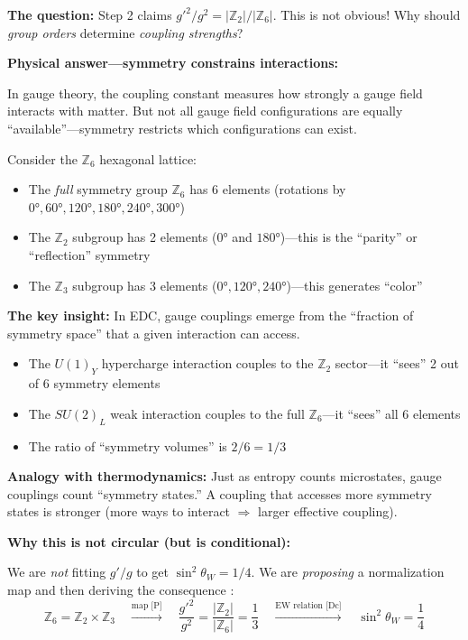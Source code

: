\begin{tcolorbox}[colback=blue!5, colframe=blue!50!black,
  title={Physical Motivation: Why Subgroup Counting $\to$ Coupling Ratios}, breakable]

\textbf{The question:} Step 2 claims $g'^2/g^2 = |\mathbb{Z}_2|/|\mathbb{Z}_6|$.
This is not obvious! Why should \emph{group orders} determine \emph{coupling strengths}?

\textbf{Physical answer---symmetry constrains interactions:}

In gauge theory, the coupling constant measures how strongly a gauge field interacts
with matter. But not all gauge field configurations are equally ``available''---symmetry
restricts which configurations can exist.

Consider the $\mathbb{Z}_6$ hexagonal lattice:
\begin{itemize}
\item The \emph{full} symmetry group $\mathbb{Z}_6$ has 6 elements (rotations by $0°, 60°, 120°, 180°, 240°, 300°$)
\item The $\mathbb{Z}_2$ subgroup has 2 elements ($0°$ and $180°$)---this is the ``parity'' or ``reflection'' symmetry
\item The $\mathbb{Z}_3$ subgroup has 3 elements ($0°, 120°, 240°$)---this generates ``color''
\end{itemize}

\textbf{The key insight:} In EDC, gauge couplings emerge from the ``fraction of symmetry space''
that a given interaction can access.

\begin{itemize}
\item The $U(1)_Y$ hypercharge interaction couples to the $\mathbb{Z}_2$ sector---it ``sees''
      2 out of 6 symmetry elements
\item The $SU(2)_L$ weak interaction couples to the full $\mathbb{Z}_6$---it ``sees'' all 6 elements
\item The ratio of ``symmetry volumes'' is $2/6 = 1/3$
\end{itemize}

\textbf{Analogy with thermodynamics:} Just as entropy counts microstates, gauge couplings
count ``symmetry states.'' A coupling that accesses more symmetry states is stronger
(more ways to interact $\Rightarrow$ larger effective coupling).

\textbf{Why this is not circular (but is conditional):}

We are \emph{not} fitting $g'/g$ to get $\sin^2\theta_W = 1/4$.
We are \emph{proposing} a normalization map \tagP{} and then deriving the consequence \tagDc{}:
\[
\mathbb{Z}_6 = \mathbb{Z}_2 \times \mathbb{Z}_3 \quad \xrightarrow{\text{map [P]}} \quad
\frac{g'^2}{g^2} = \frac{|\mathbb{Z}_2|}{|\mathbb{Z}_6|} = \frac{1}{3}
\quad \xrightarrow{\text{EW relation [Dc]}} \quad
\sin^2\theta_W = \frac{1}{4}
\]


\end{tcolorbox}
